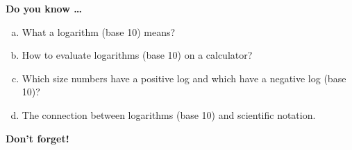 

\bigskip

\noindent \textbf{Do you know \ldots}

\begin{enumerate} [(a)]
\item What a logarithm (base 10) means? \vfill
\item How to evaluate logarithms (base 10) on a calculator? \vfill
\item Which size numbers have a positive log and which have a negative log (base 10)? \vfill
\item The connection between logarithms (base 10) and scientific notation. \vfill
\end{enumerate}

\noindent \textbf{Don't forget!}
\vfill \vfill \vfill




